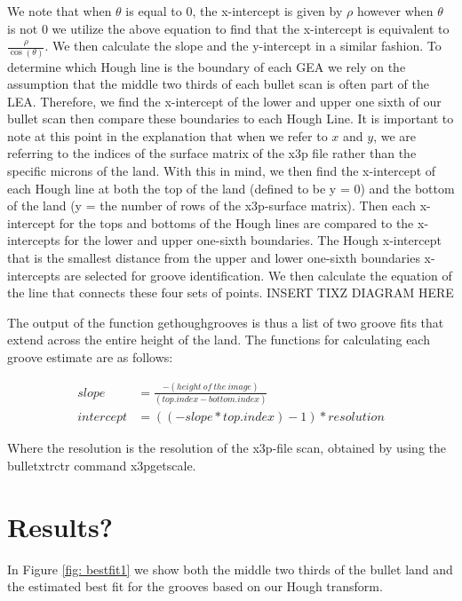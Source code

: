 \documentclass[12pt]{article}
\theoremstyle{nonumberplain}
\begin{document}
We note that when $\theta$ is equal to 0, the x-intercept is given by $\rho$ however when $\theta$ is not 0 we utilize the above equation to find that the x-intercept is equivalent to $\frac{\rho}{\cos(\theta)}$. We then calculate the slope and the y-intercept in a similar fashion. To determine which Hough line is the boundary of each GEA we rely on the assumption that the middle two thirds of each bullet scan is often part of the LEA. Therefore, we find the x-intercept of the lower and upper one sixth of our bullet scan then compare these boundaries to each Hough Line. It is important to note at this point in the explanation that when we refer to $x$ and $y$, we are referring to the indices of the surface matrix of the x3p file rather than the specific microns of the land. With this in mind, we then find the x-intercept of each Hough line at both the top of the land (defined to be y = 0) and the bottom of the land (y = the number of rows of the x3p-surface matrix). Then each x-intercept for the tops and bottoms of the Hough lines are compared to the x-intercepts for the lower and upper one-sixth boundaries. The Hough x-intercept that is the smallest distance from the upper and lower one-sixth boundaries x-intercepts are selected for groove identification. We then calculate the equation of the line that connects these four sets of points. INSERT TIXZ DIAGRAM HERE

The output of the function get\textunderscore hough\textunderscore grooves is thus a list of two groove fits that extend across the entire height of the land. The functions for calculating each groove estimate are as follows:

\begin{align}
slope &= \frac{-(height \ of \ the \ image)}{(top.index - bottom.index)} \\
intercept &= ((- slope * top.index) - 1 ) * resolution
\end{align}

Where the resolution is the resolution of the x3p-file scan, obtained by using the bulletxtrctr command x3p\textunderscore get\textunderscore scale. 
\section{Results?}

In Figure \ref{fig: bestfit1} we show both the middle two thirds of the bullet land and the estimated best fit for the grooves based on our Hough transform.
\end{document}
